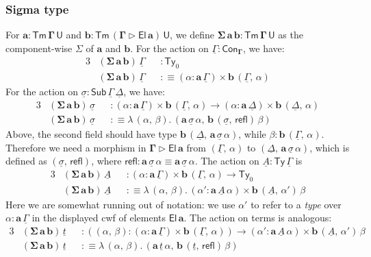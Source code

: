 \documentclass[12pt,a4paper,twoside,openany]{book}
\theoremstyle{remark}
\theoremstyle{definition}
\theoremstyle{theorem}
\newcommand{\bs}[1]{\boldsymbol{#1}}
\newcommand{\refl}{\mathsf{refl}}
\newcommand{\Con}{\mathsf{Con}}
\newcommand{\Sub}{\mathsf{Sub}}
\newcommand{\Tm}{\mathsf{Tm}}
\newcommand{\Ty}{\mathsf{Ty}}
\newcommand{\U}{\mathsf{U}}
\newcommand{\El}{\mathsf{El}}
\newcommand{\ext}{\triangleright}
\newcommand{\bGamma}{\bs{\Gamma}}
\newcommand{\ba}{\bs{a}}
\newcommand{\bb}{\bs{b}}
\newcommand{\ul}[1]{\underline{#1}}
\newcommand{\ulGamma}{\ul{\Gamma}}
\newcommand{\ulDelta}{\ul{\Delta}}
\newcommand{\ulsigma}{\ul{\sigma}}
\newcommand{\ult}{\ul{t}}
\newcommand{\ulA}{\ul{A}}
\newcommand{\defn}{:\equiv}
\begin{document}
\subsubsection{Sigma type}

For $\bs{a : \Tm\,\Gamma\,\U}$ and $\bs{b : \Tm\,(\Gamma\ext \El\,a)\,\U}$, we
define $\bs{\Sigma\,a\,b : \Tm\,\Gamma\,\U}$ as the component-wise $\Sigma$ of $\ba$
and $\bb$. For the action on $\ulGamma : \Con_{\bGamma}$, we have:
\begin{alignat*}{3}
  &(\bs{\Sigma\,a\,b})\,\ulGamma && : \Ty_0 \\
  &(\bs{\Sigma\,a\,b})\,\ulGamma &&\defn (\alpha : \ba\,\ulGamma) \times \bb\,(\ulGamma,\,\alpha)
\end{alignat*}
For the action on $\ulsigma : \Sub\,\ulGamma\,\ulDelta$, we have:
\begin{alignat*}{3}
  &(\bs{\Sigma\,a\,b})\,\ulsigma && : (\alpha : \ba\,\ulGamma) \times \bb\,(\ulGamma,\,\alpha)
    \to (\alpha : \ba\,\ulDelta) \times \bb\,(\ulDelta,\,\alpha)\\
  &(\bs{\Sigma\,a\,b})\,\ulsigma &&\defn \lambda\,(\alpha,\,\beta).\,(\ba\,\ulsigma\,\alpha,\,\bb\,(\ulsigma,\,\refl)\,\beta)
\end{alignat*}
Above, the second field should have type
$\bb\,(\ulDelta,\,\ba\,\ulsigma\,\alpha)$, while $\beta :
\bb\,(\ulGamma,\,\alpha)$. Therefore we need a morphism in $\bs{\Gamma \ext
  \El\,a}$ from $(\ulGamma,\,\alpha)$ to $(\ulDelta,\,\ba\,\ulsigma\,\alpha)$,
which is defined as $(\ulsigma,\,\refl)$, where $\refl : \ba\,\ulsigma\,\alpha
\equiv \ba\,\ulsigma\,\alpha$.
The action on $\ulA : \Ty\,\ulGamma$ is
\begin{alignat*}{3}
  &(\bs{\Sigma\,a\,b})\,\ulA &&: (\alpha : \ba\,\ulGamma) \times \bb\,(\ulGamma,\,\alpha)
    \to \Ty_0\\
  &(\bs{\Sigma\,a\,b})\,\ulA &&\defn \lambda\,(\alpha,\,\beta).\,(\alpha' : \ba\,\ulA\,\alpha) \times \bb\,(\ulA,\,\alpha')\,\beta
\end{alignat*}
Here we are somewhat running out of notation: we use $\alpha'$ to refer to a
\emph{type} over $\alpha : \ba\,\ulGamma$ in the displayed cwf of elements
$\bs{\El\,a}$. The action on terms is analogous:
\begin{alignat*}{3}
  &(\bs{\Sigma\,a\,b})\,\ult && : ((\alpha,\,\beta) : (\alpha : \ba\,\ulGamma) \times \bb\,(\ulGamma,\,\alpha))
    \to (\alpha' : \ba\,\ulA\,\alpha) \times \bb\,(\ulA,\,\alpha')\,\beta\\
  &(\bs{\Sigma\,a\,b})\,\ult &&\defn \lambda\,(\alpha,\,\beta).\,(\ba\,\ult\,\alpha,\,\bb\,(\ult,\,\refl)\,\beta)
\end{alignat*}
\end{document}
